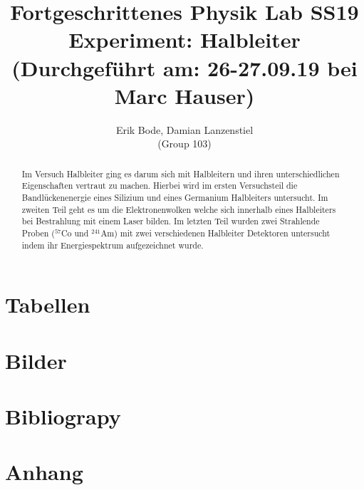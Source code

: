\documentclass[30pt,a4paper]{article}
\title{
	\large Fortgeschrittenes Physik Lab	SS19 \\[4mm]
	\textbf{\LARGE Experiment: Halbleiter
	} \\[4mm]
	(Durchgeführt am: 26-27.09.19 bei Marc Hauser) \\}
\author{Erik Bode, Damian Lanzenstiel \\ (Group 103)}
\begin{document}
	
	\begin{titlepage}
		\maketitle
		\vspace{2cm}
		\begin{abstract}
		Im Versuch Halbleiter ging es darum sich mit Halbleitern und ihren unterschiedlichen Eigenschaften vertraut zu machen. Hierbei wird im ersten Versuchsteil die Bandlückenenergie eines Silizium und eines Germanium Halbleiters untersucht. Im zweiten Teil geht es um die Elektronenwolken welche sich innerhalb eines Halbleiters bei Bestrahlung mit einem Laser bilden. Im letzten Teil wurden zwei Strahlende Proben ($^{57}$Co und $^{241}$Am) mit zwei verschiedenen Halbleiter Detektoren untersucht indem ihr Energiespektrum aufgezeichnet wurde. 
		\end{abstract}
	\end{titlepage}
	\newpage
	\tableofcontents
	\newpage
	
	
		
		
	
	
		
	
	
	
	
	
	
	
	\section{Tabellen}
	\listoftables
	\section{Bilder}
	\listoffigures
	\section{Bibliograpy}
	
	
	\section{Anhang}
	
\end{document}
